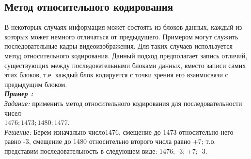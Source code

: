 \subsection{Метод относительного кодирования}
В некоторых случаях информация может состоять из блоков данных, каждый из которых может немного отличаться от предыдущего. Примером могут служить последовательные кадры видеоизображения. Для таких случаев используется метод относительного кодирования. Данный подход предполагает запись отличий, существующих между последовательными блоками данных, вместо записи самих этих блоков, т.е. каждый блок кодируется с точки зрения его взаимосвязи с предыдущим блоком. 
\\\emph{\textbf{Пример :}}
\\\emph{Задание:} применить метод относительного кодирования для последовательности чисел \\$1476; 1473; 1480; 1477$.
\\\emph{Решение:} Берем изначально число1476, смещение до 1473 относительно него равно -3, смещение до 1480 относительно второго числа равно +7; т.о. представим последовательность в следующем виде: 1476; -3; +7; -3.

